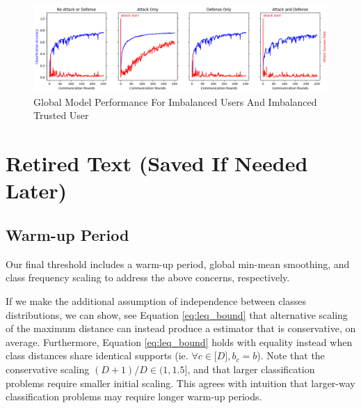 \documentclass{article} %
\begin{document}
\begin{figure}[H]
    \centering
    \includegraphics[width=\textwidth]{01_trusted/centralized/alpha1--alpha_val1/visuals/accuracy--n_malicious1--m_start1.png}
    \caption{Global Model Performance For Imbalanced Users And Imbalanced Trusted User}
    \label{fig:centralized--alpha1--alpha_val1--accuracy--n_malicious1--m_start1}
\end{figure} 



% 
\section{Retired Text (Saved If Needed Later)}

%
\subsection{Warm-up Period}

Our final threshold includes a warm-up period, global min-mean smoothing, and class frequency scaling to address the above concerns, respectively.

If we make the additional assumption of independence between classes distributions, we can show, see Equation \ref{eq:leq_bound} that alternative scaling of the maximum distance can instead produce a estimator that is conservative, on average. Furthermore, Equation \ref{eq:leq_bound} holds with equality instead when class distances share identical supports (ie. $\forall c \in \mathopen[ D \mathclose], b_c = b$). Note that the conservative scaling $(D + 1) / D \in \mathopen(1, \mathclose 1.5]$, and that larger classification problems require smaller initial scaling. This agrees with intuition that larger-way classification problems may require longer warm-up periods. 
\end{document}
